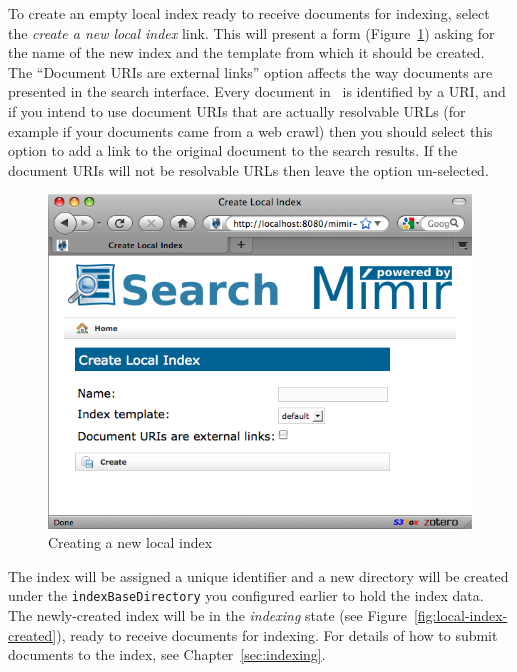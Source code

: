 To create an empty local index ready to receive documents for indexing, select
the {\em create a new local index} link.  This will present a form
(Figure~\ref{fig:new-local-index}) asking for the name of the new index and the
template from which it should be created.  The ``Document URIs are external
links'' option affects the way documents are presented in the search interface.
Every document in \Mimir\ is identified by a URI, and if you intend to use
document URIs that are actually resolvable URLs (for example if your documents
came from a web crawl) then you should select this option to add a link to the
original document to the search results.  If the document URIs will not be
resolvable URLs then leave the option un-selected.
%
\begin{figure}[htb!]
\begin{center}
\includegraphics[scale=0.5]{img/new-local-index}
\end{center}
\caption{Creating a new local index}
\label{fig:new-local-index}
\end{figure}
%
The index will be assigned a unique identifier and a new directory will be
created under the \verb|indexBaseDirectory| you configured earlier to
hold the index data.  The newly-created index will be in the {\em indexing}
state (see Figure~\ref{fig:local-index-created}), ready to receive documents
for indexing.  For details of how to submit documents to the index, see
Chapter~\ref{sec:indexing}.
%
